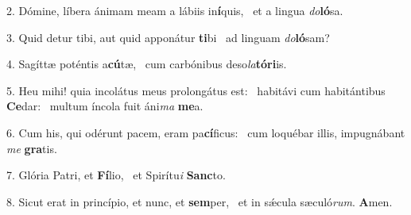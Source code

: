 2. Dómine, líbera ánimam meam a lábiis in\textbf{í}quis, \ast\  et a lingua \textit{do}\textbf{ló}sa.\

3. Quid detur tibi, aut quid apponátur \textbf{ti}bi \ast\  ad linguam \textit{do}\textbf{ló}sam?\

4. Sagíttæ poténtis a\textbf{cú}tæ, \ast\  cum carbónibus deso\textit{la}\textbf{tó}\textbf{ri}is.\

5. Heu mihi! quia incolátus meus prolongátus est: \dag\  habitávi cum habitántibus \textbf{Ce}dar: \ast\  multum íncola fuit áni\textit{ma} \textbf{me}a.\

6. Cum his, qui odérunt pacem, eram pa\textbf{cí}ficus: \ast\  cum loquébar illis, impugnábant \textit{me} \textbf{gra}tis.\

7. Glória Patri, et \textbf{Fí}lio, \ast\  et Spirítu\textit{i} \textbf{Sanc}to.\

8. Sicut erat in princípio, et nunc, et \textbf{sem}per, \ast\  et in sǽcula sæculó\textit{rum}. \textbf{A}men.\

